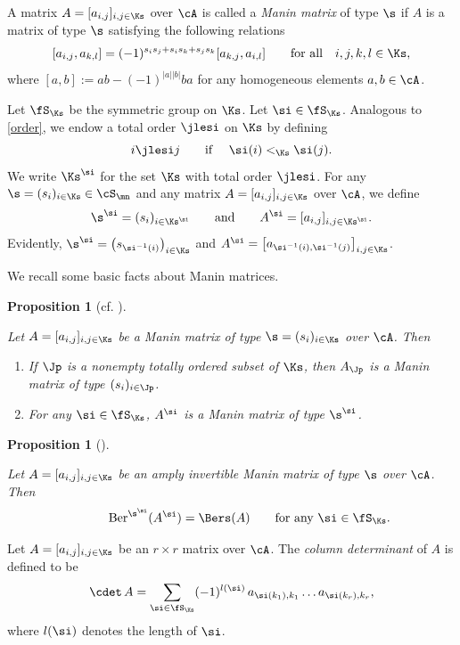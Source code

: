 \documentclass[11pt, reqno]{amsart}
\newtheorem{prop}[thm]{Proposition}
\theoremstyle{definition}
\theoremstyle{remark}
\numberwithin{equation}{section}
\begin{document}
A matrix $A=[a_{i,j}]_{i,j \in \Ks}$ over $\cA$ is called a \emph{Manin matrix} of type $\s$ if $A$ is a matrix of type $\s$ satisfying the following relations
$$
[a_{i,j}, a_{k,l}]=(-1)^{s_i s_j+s_i s_k+s_j s_k}[a_{k,j}, a_{i, l}]  \qquad  \text{for all}  \quad i,j,k,l \in \Ks,
$$
where $[a, b]:=ab-(-1)^{|a||b|}ba$ for any homogeneous elements $a, b \in \cA$.


Let $\fS_{\Ks}$ be the symmetric group on $\Ks$.
Let $\si \in  \fS_\Ks$.
Analogous to \eqref{order}, we endow a total order $\jlesi$ on $\Ks$ by defining
$$
i \jlesi j \qquad \mbox{if $\quad \si(i)<_\Ks \si(j)$.}
$$
We write $\Ks^\si$ for the set $\Ks$ with total order $\jlesi$.
%
For any $\s =(s_i)_{i \in \Ks} \in \cS_\mn$ and any matrix $A=[a_{i,j}]_{i,j \in \Ks}$ over $\cA$, we define
$$
\s^\si=(s_i)_{i \in \Ks^\si} \qquad \text{and} \qquad A^\si=[a_{i,j}]_{i,j \in \Ks^\si}.
$$
Evidently, $\s^\si=\left(s_{\si^{-1}(i)} \right)_{i \in \Ks}$ and $A^\si=\big[a_{\si^{-1}(i),\si^{-1}(j)} \big]_{i,j \in \Ks}$.


We recall some basic facts about Manin matrices.

\begin{prop}[{cf. \cite[Section 3]{HM}}] \label{basics}

Let $A=[a_{i,j}]_{i,j \in \Ks}$ be a Manin matrix of type $\s=(s_i)_{i \in \Ks}$ over $\cA$. Then

\begin{enumerate}[\normalfont(i)]

\item If $\Jp$ is a nonempty totally ordered subset of $\Ks$, then $A_{\Jp}$ is a Manin matrix of type $(s_i)_{i \in \Jp}$.

\item For any $\si \in \fS_{\Ks}$, $A^\si$ is a Manin matrix of type $\s^\si$.

\end{enumerate}
\end{prop}

\begin{prop} [{\cite[Proposition 3.6]{HM}}] \label{HM}

Let $A=[a_{i,j}]_{i,j \in \Ks}$ be an amply invertible Manin matrix of type $\s$ over $\cA$.
Then
$$
 \hspace{1cm}  {\rm Ber}^{\s^\si} (A^\si)=\Bers (A)  \qquad \mbox{for any $\si \in \fS_{\Ks}$.}
$$
\end{prop}

Let $A=[a_{i,j}]_{i,j \in \Ks}$ be an $r \times r$ matrix over $\cA$. The \emph{column determinant} of $A$ is defined to be
$$
\cdet \,  A=\sum_{\si \in \fS_{\Ks}} (-1)^{l(\si)} \,  a_{\si(k_1),k_1}\ldots a_{\si(k_r),k_r},
$$
where $l(\si)$ denotes the length of $\si$.
\end{document}
